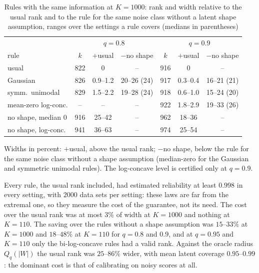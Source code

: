 \documentclass[12pt]{article}
\theoremstyle{definition}
\begin{document}
\begin{table}[htbp]
\renewcommand{\baselinestretch}{1}
\caption{Rules with the same information at $K = 1000$: rank and width relative to the usual rank and to the rule for the same noise class without a latent shape assumption, ranges over the settings a rule covers (medians in parentheses)}
\label{tab:sameinfo}
\centering
\fontsize{9}{11pt}\selectfont
\begin{tabular}{lcccccc}
\toprule
& \multicolumn{3}{c}{$q = 0.8$} & \multicolumn{3}{c}{$q = 0.9$} \\
rule & $k$ & $+$usual & $-$no shape & $k$ & $+$usual & $-$no shape \\
\midrule
usual & 822 & 0 & -- & 916 & 0 & -- \\
Gaussian & 826 & 0.9--1.2 & 20--26 (24) & 917 & 0.3--0.4 & 16--21 (21) \\
symm.\ unimodal & 829 & 1.5--2.2 & 19--28 (24) & 918 & 0.6--1.0 & 15--24 (20) \\
mean-zero log-conc. & -- & -- & -- & 922 & 1.8--2.9 & 19--33 (26) \\
no shape, median 0 & 916 & 25--42 & -- & 962 & 18--36 & -- \\
no shape, log-conc. & 941 & 36--63 & -- & 974 & 25--54 & -- \\
\bottomrule
\end{tabular}
\par\smallskip
\parbox{\textwidth}{\fontsize{8}{10pt}\selectfont Widths in percent: $+$usual, above the usual rank; $-$no shape, below the rule for the same noise class without a shape assumption (median-zero for the Gaussian and symmetric unimodal rules). The log-concave level is certified only at $q = 0.9$.}
\end{table}

Every rule, the usual rank included, had estimated reliability at least $0.998$ in every setting, with $2000$ data sets per setting: these laws are far from the extremal one, so they measure the cost of the guarantee, not its need. The cost over the usual rank was at most $3\%$ of width at $K = 1000$ and nothing at $K = 110$. The saving over the rules without a shape assumption was $15$--$33\%$ at $K = 1000$ and $18$--$48\%$ at $K = 110$ for $q = 0.8$ and $0.9$, and at $q = 0.95$ and $K = 110$ only the bi-log-concave rules had a valid rank. Against the oracle radius $Q_q(|W|)$ the usual rank was $25$--$86\%$ wider, with mean latent coverage $0.95$--$0.99$: the dominant cost is that of calibrating on noisy scores at all.
\end{document}
